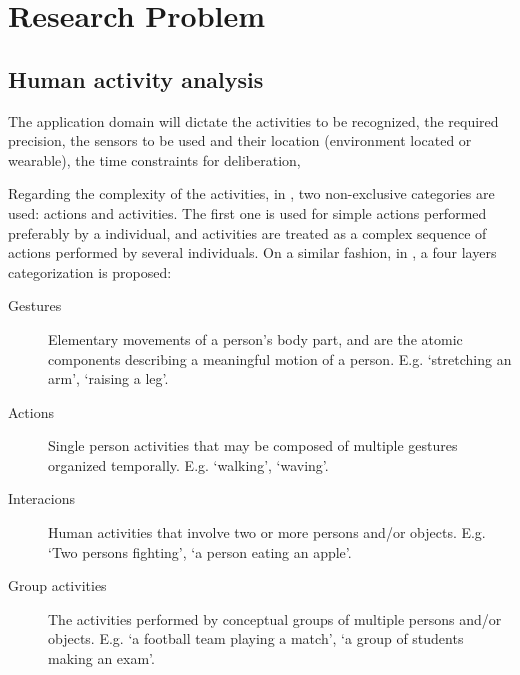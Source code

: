\chapter{Research Problem}

\section{Human activity analysis}


The application domain will dictate the activities to be recognized, the required precision, the sensors to be used and their location (environment located or wearable), the time constraints for deliberation,





Regarding the complexity of the activities, in \citep{Turaga2008_MaRecHuAcSurv}, two non-exclusive categories are used: actions and activities.
The first one is used for simple actions performed preferably by a individual, and activities are treated as a complex sequence of actions performed by several individuals. 
On a similar fashion, in \citep{Aggarwal11_HumanActivity}, a four layers categorization is proposed:

\begin{description}
\item[Gestures] Elementary movements of a person's body part, and are the atomic components describing a meaningful motion of a person. 
E.g. `stretching an arm', `raising a leg'.
\item[Actions] Single person activities that may be composed of multiple gestures organized temporally. 
E.g. `walking', `waving'.
\item[Interacions] Human activities that involve two or more persons and/or objects. 
E.g. `Two persons fighting', `a person eating an apple'.
\item[Group activities] The activities performed by conceptual groups of multiple persons and/or objects. 
E.g. `a football team playing a match', `a group of students making an exam'.
\end{description}










